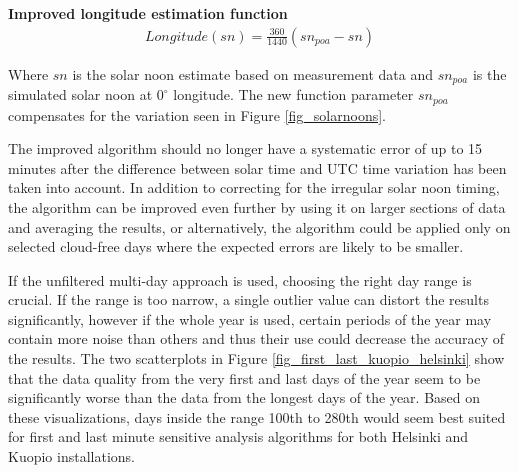 \newpage
\noindent\textbf{Improved longitude estimation function }
%
\begin{equation}
\begin{split}
\label{equation_longitude_estimation_2}
Longitude(sn)= \frac{360}{1440}(sn_{poa}-sn)
\end{split}
\end{equation}

\noindent Where $sn$ is the solar noon estimate based on measurement data and $sn_{poa}$ is the simulated solar noon at $0^\circ$ longitude. The new function parameter $sn_{poa}$ compensates for the variation seen in Figure \ref{fig_solarnoons}.



\vspace{5mm}


\noindent



\vspace{0.5cm}
\noindent The improved algorithm should no longer have a systematic error of up to 15 minutes after the difference between solar time and UTC time variation has been taken into account. In addition to correcting for the irregular solar noon timing, the algorithm can be improved even further by using it on larger sections of data and averaging the results, or alternatively, the algorithm could be applied only on selected cloud-free days where the expected errors are likely to be smaller.

If the unfiltered multi-day approach is used, choosing the right day range is crucial. If the range is too narrow, a single outlier value can distort the results significantly, however if the whole year is used, certain periods of the year may contain more noise than others and thus their use could decrease the accuracy of the results. The two scatterplots in Figure \ref{fig_first_last_kuopio_helsinki} show that the data quality from the very first and last days of the year seem to be significantly worse than the data from the longest days of the year. Based on these visualizations, days inside the range 100th to 280th would seem best suited for first and last minute sensitive analysis algorithms for both Helsinki and Kuopio installations.



